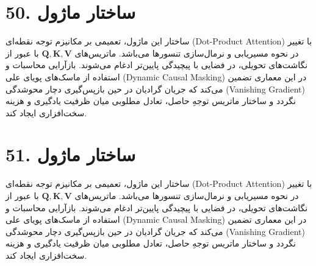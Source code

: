 \documentclass[12pt,a4paper]{report}
\begin{document}
\section*{50. ساختار ماژول }
ساختار این ماژول، تعمیمی بر مکانیزم توجه نقطه‌ای (Dot-Product Attention) با تغییر در نحوه مسیریابی و نرمال‌سازی تنسورها می‌باشد. ماتریس‌های $\mathbf{Q, K, V}$ با عبور از نگاشت‌های تحویلی، در فضایی با پیچیدگی پایین‌تر ادغام می‌شوند. بازآرایی محاسبات و استفاده از ماسک‌های پویای علی (Dynamic Causal Masking) در این معماری تضمین می‌کند که جریان گرادیان در حین بازپس‌گیری دچار محوشدگی (Vanishing Gradient) نگردد و ساختار ماتریس توجهِ حاصل، تعادل مطلوبی میان ظرفیت یادگیری و هزینه سخت‌افزاری ایجاد کند.

\section*{51. ساختار ماژول }
ساختار این ماژول، تعمیمی بر مکانیزم توجه نقطه‌ای (Dot-Product Attention) با تغییر در نحوه مسیریابی و نرمال‌سازی تنسورها می‌باشد. ماتریس‌های $\mathbf{Q, K, V}$ با عبور از نگاشت‌های تحویلی، در فضایی با پیچیدگی پایین‌تر ادغام می‌شوند. بازآرایی محاسبات و استفاده از ماسک‌های پویای علی (Dynamic Causal Masking) در این معماری تضمین می‌کند که جریان گرادیان در حین بازپس‌گیری دچار محوشدگی (Vanishing Gradient) نگردد و ساختار ماتریس توجهِ حاصل، تعادل مطلوبی میان ظرفیت یادگیری و هزینه سخت‌افزاری ایجاد کند.
\end{document}
